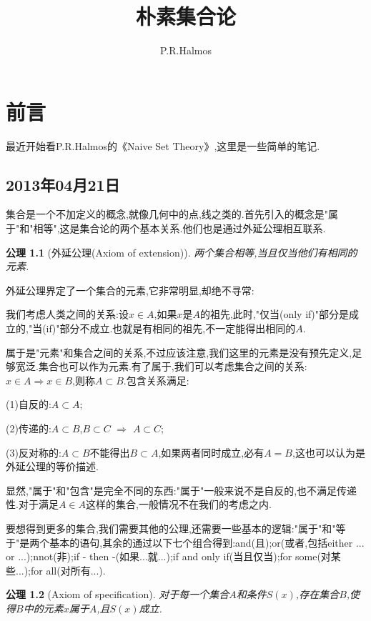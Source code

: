 \documentclass[12pt,a4paper,openany]{book}
\title{朴素集合论}
\author{P.R.Halmos}
\newtheorem{axiom}{公理}[section]
\begin{document}
\frontmatter
\frontmatter
\begin{titlepage}
\maketitle
\end{titlepage}
\setcounter{page}{0}
\chapter{前言}
最近开始看P.R.Halmos的《Naive Set Theory》,这里是一些简单的笔记.

\tableofcontents

\mainmatter
\section{2013年04月21日}
集合是一个不加定义的概念,就像几何中的点,线之类的.首先引入的概念是"属于"和"相等",这是集合论的两个基本关系.他们也是通过外延公理相互联系.

\begin{axiom}[外延公理(Axiom of extension)]
两个集合相等,当且仅当他们有相同的元素.
\end{axiom}

外延公理界定了一个集合的元素,它非常明显,却绝不寻常:

我们考虑人类之间的关系:设$x \in A$,如果$x$是$A$的祖先,此时,"仅当(only if)"部分是成立的,"当(if)"部分不成立.也就是有相同的祖先,不一定能得出相同的$A$.

属于是"元素"和集合之间的关系,不过应该注意,我们这里的元素是没有预先定义,足够宽泛.集合也可以作为元素.有了属于,我们可以考虑集合之间的关系:$x \in A \Rightarrow x \in B$,则称$A \subset B$.包含关系满足:

(1)自反的:$A \subset A$;

(2)传递的:$A \subset B$,$B \subset C$ $\Rightarrow$ $A \subset C$;

(3)反对称的:$A \subset B$不能得出$B \subset A$,如果两者同时成立,必有$A = B$,这也可以认为是外延公理的等价描述.

显然,"属于"和"包含"是完全不同的东西:"属于"一般来说不是自反的,也不满足传递性.对于满足$A \in A$这样的集合,一般情况不在我们的考虑之内.

要想得到更多的集合,我们需要其他的公理,还需要一些基本的逻辑:"属于"和"等于"是两个基本的语句,其余的通过以下七个组合得到:and(且);or(或者,包括either ... or ...);nnot(非);if - then -(如果...就...);if and only if(当且仅当);for some(对某些...);for all(对所有...).

\begin{axiom}[Axiom of specification]
对于每一个集合$A$和条件$S(x)$,存在集合$B$,使得$B$中的元素$x$属于$A$,且$S(x)$成立.
\end{axiom}
\end{document}
